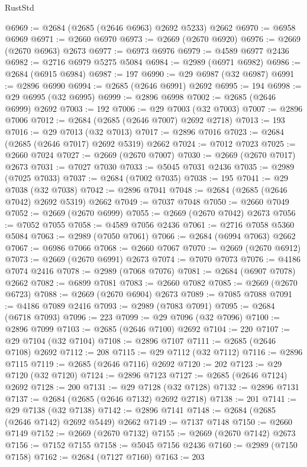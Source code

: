 \begin{lexlean}{RustStd}
\begin{coremodule}
@6969 := @2684 (@2685 (@2646 @6963) @2692 @5233) @2662
@6970 := @6958 @6969
@6971 := @2660 @6970
@6973 := @2669 (@2670 @6920)
@6976 := @2669 (@2670 @6963) @2673
@6977 := @6973 @6976
@6979 := @4589 @6977 @2436
@6982 := @2716 @6979 @5275 @5084
@6984 := @2989 (@6971 @6982)
@6986 := @2684 (@6915 @6984)
@6987 := 197
@6990 := @29 @6987 (@32 @6987)
@6991 := @2896 @6990
@6994 := @2685 (@2646 @6991) @2692
@6995 := 194
@6998 := @29 @6995 (@32 @6995)
@6999 := @2896 @6998
@7002 := @2685 (@2646 @6999) @2692
@7003 := 192
@7006 := @29 @7003 (@32 @7003)
@7007 := @2896 @7006
@7012 := @2684 (@2685 (@2646 @7007) @2692 @2718)
@7013 := 193
@7016 := @29 @7013 (@32 @7013)
@7017 := @2896 @7016
@7023 := @2684 (@2685 (@2646 @7017) @2692 @5319) @2662
@7024 := @7012 @7023
@7025 := @2660 @7024
@7027 := @2669 (@2670 @7007)
@7030 := @2669 (@2670 @7017) @2673
@7031 := @7027 @7030
@7033 := @5045 @7031 @2436
@7035 := @2989 (@7025 @7033)
@7037 := @2684 (@7002 @7035)
@7038 := 195
@7041 := @29 @7038 (@32 @7038)
@7042 := @2896 @7041
@7048 := @2684 (@2685 (@2646 @7042) @2692 @5319) @2662
@7049 := @7037 @7048
@7050 := @2660 @7049
@7052 := @2669 (@2670 @6999)
@7055 := @2669 (@2670 @7042) @2673
@7056 := @7052 @7055
@7058 := @4589 @7056 @2436
@7061 := @2716 @7058 @5360 @5084
@7063 := @2989 (@7050 @7061)
@7066 := @2684 (@6994 @7063) @2662
@7067 := @6986 @7066
@7068 := @2660 @7067
@7070 := @2669 (@2670 @6912)
@7073 := @2669 (@2670 @6991) @2673
@7074 := @7070 @7073
@7076 := @4186 @7074 @2416
@7078 := @2989 (@7068 @7076)
@7081 := @2684 (@6907 @7078) @2662
@7082 := @6899 @7081
@7083 := @2660 @7082
@7085 := @2669 (@2670 @6723)
@7088 := @2669 (@2670 @6904) @2673
@7089 := @7085 @7088
@7091 := @4186 @7089 @2416
@7093 := @2989 (@7083 @7091)
@7095 := @2684 (@6718 @7093)
@7096 := 223
@7099 := @29 @7096 (@32 @7096)
@7100 := @2896 @7099
@7103 := @2685 (@2646 @7100) @2692
@7104 := 220
@7107 := @29 @7104 (@32 @7104)
@7108 := @2896 @7107
@7111 := @2685 (@2646 @7108) @2692
@7112 := 208
@7115 := @29 @7112 (@32 @7112)
@7116 := @2896 @7115
@7119 := @2685 (@2646 @7116) @2692
@7120 := 202
@7123 := @29 @7120 (@32 @7120)
@7124 := @2896 @7123
@7127 := @2685 (@2646 @7124) @2692
@7128 := 200
@7131 := @29 @7128 (@32 @7128)
@7132 := @2896 @7131
@7137 := @2684 (@2685 (@2646 @7132) @2692 @2718)
@7138 := 201
@7141 := @29 @7138 (@32 @7138)
@7142 := @2896 @7141
@7148 := @2684 (@2685 (@2646 @7142) @2692 @5449) @2662
@7149 := @7137 @7148
@7150 := @2660 @7149
@7152 := @2669 (@2670 @7132)
@7155 := @2669 (@2670 @7142) @2673
@7156 := @7152 @7155
@7158 := @5045 @7156 @2436
@7160 := @2989 (@7150 @7158)
@7162 := @2684 (@7127 @7160)
@7163 := 203

\end{coremodule}
\end{lexlean}
